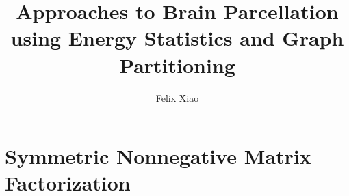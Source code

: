 \documentclass{report}
\title{Approaches to Brain Parcellation using Energy Statistics and Graph Partitioning}
\author{Felix Xiao}
\begin{document}
\maketitle
\tableofcontents

%

%

%

%

%

\chapter{Symmetric Nonnegative Matrix Factorization}




\end{document}
